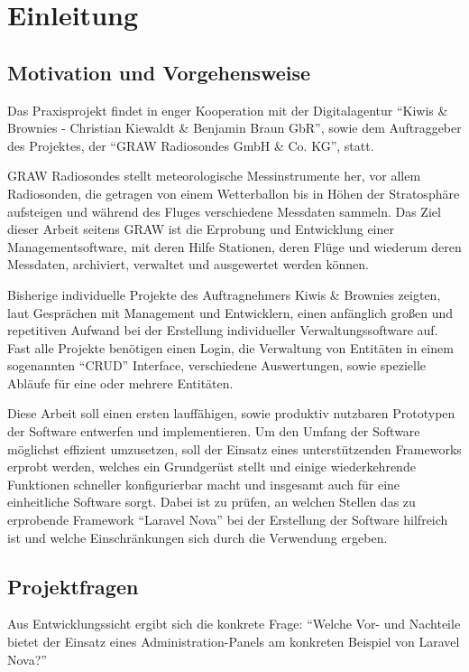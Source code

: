\section{Einleitung}

\subsection{Motivation und Vorgehensweise}
Das Praxisprojekt findet in enger Kooperation mit der Digitalagentur \enquote{Kiwis \& Brownies - Christian Kiewaldt \& Benjamin Braun GbR}\cite{kiwis}, sowie dem Auftraggeber des Projektes, der \enquote{GRAW Radiosondes GmbH \& Co. KG}\cite{graw}, statt.

GRAW Radiosondes stellt meteorologische Messinstrumente her, vor allem Radiosonden, die getragen von einem Wetterballon bis in Höhen der Stratosphäre aufsteigen und während des Fluges verschiedene Messdaten sammeln.
Das Ziel dieser Arbeit seitens GRAW ist die Erprobung und Entwicklung einer Managementsoftware, mit deren Hilfe Stationen, deren Flüge und wiederum deren Messdaten, archiviert, verwaltet und ausgewertet werden können.

Bisherige individuelle Projekte des Auftragnehmers Kiwis \& Brownies zeigten, laut Gesprächen mit Management und Entwicklern, einen anfänglich großen und repetitiven Aufwand bei der Erstellung individueller Verwaltungssoftware auf.
Fast alle Projekte benötigen einen Login, die Verwaltung von Entitäten in einem sogenannten \enquote{CRUD}\cite{crud} Interface, verschiedene Auswertungen, sowie spezielle Abläufe für eine oder mehrere Entitäten.

Diese Arbeit soll einen ersten lauffähigen, sowie produktiv nutzbaren Prototypen der Software entwerfen und implementieren.
Um den Umfang der Software möglichst effizient umzusetzen, soll der Einsatz eines unterstützenden Frameworks erprobt werden, welches ein Grundgerüst stellt und einige wiederkehrende Funktionen schneller konfigurierbar macht und insgesamt auch für eine einheitliche Software sorgt.
Dabei ist zu prüfen, an welchen Stellen das zu erprobende Framework \enquote{Laravel Nova}\cite{laravel-nova} bei der Erstellung der Software hilfreich ist und welche Einschränkungen sich durch die Verwendung ergeben.
\newpage

\subsection{Projektfragen}
Aus Entwicklungssicht ergibt sich die konkrete Frage:
\enquote{Welche Vor- und Nachteile bietet der Einsatz eines Administration-Panels am konkreten Beispiel von Laravel Nova?}

